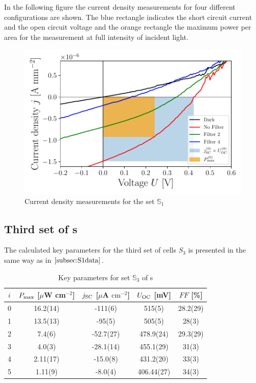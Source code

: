 In the following figure the current density measurements for four different configurations are shown. The blue rectangle indicates the short circuit current and the open circuit voltage and the orange rectangle the maximum power per area for the measurement at full intensity of incident light.

\begin{figure}[h]\centering
\includegraphics[width=\columnwidth]{../../../IV-Curve-Analysis/OSC1Graph.pdf}
\caption{Current density measurements for the set $\mathbb{S}_1$}
\label{fig:OSC1Graph}
\end{figure}

\subsection{Third set of \BHSC s}

The calculated key parameters for the third set of cells $S_3$ is presented in the same way as in $\ref{subsec:S1data}$.

\begin{table}[h]\centering
\caption{Key parameters for set $\mathbb{S}_3$ of \BHSC s}
\label{tab:keyparams3}
\begin{tabular}{@{}ccccc@{}}\toprule
$i$ & $P_{\text{max}}$ [$\mu$W cm$^{-2}$] & $j_{\text{SC}}$ [$\mu$A $\mathrm{cm}^{-2}$] & $U_{\text{OC}}$ [mV] & $FF$ [\%]\\\midrule
0 &   16.2(14)  &  -111(6)  & 515(5) & 28.2(29) \\
1 &   13.5(13)  &  -95(5)  & 505(5) & 28(3) \\
2 &   7.4(6)  &  -52.7(27)  & 478.9(24) & 29.3(29) \\
3 &   4.0(3)  &  -28.1(14)  & 455.1(29) & 31(3) \\
4 &   2.11(17)  &  -15.0(8)  & 431.2(20) & 33(3)\\
5 &  1.11(9)  &  -8.0(4)  & 406.44(27) & 34(3) \\\bottomrule
\end{tabular}
\end{table}

